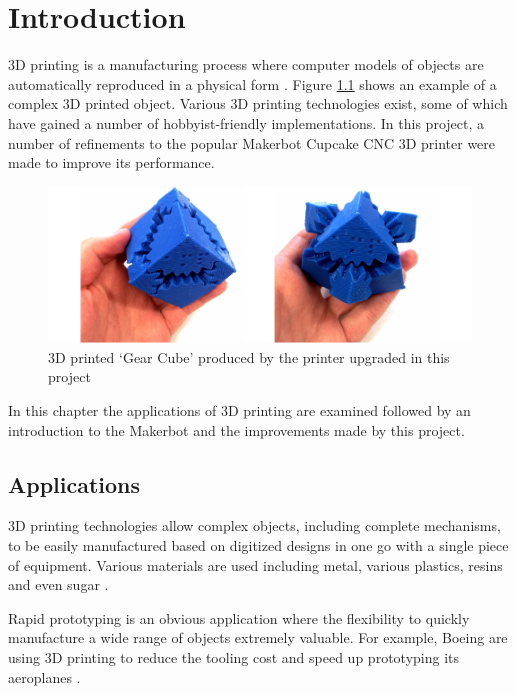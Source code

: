 \chapter{Introduction}
	
	
	3D printing is a manufacturing process where computer models of objects are
	automatically reproduced in a physical form \cite{additivemanufacturing}.
	Figure \ref{fig:gearCube} shows an example of a complex 3D printed object.
	Various 3D printing technologies exist, some of which have gained a number of
	hobbyist-friendly implementations. In this project, a number of refinements to
	the popular Makerbot Cupcake CNC 3D printer were made to improve its
	performance.
	
	\begin{figure}
		\includegraphics[width=1\textwidth]{diagrams/gearCube.pdf}
		\caption{3D printed `Gear Cube' produced by the printer upgraded in this
		project}
		\label{fig:gearCube}
	\end{figure}
	
	In this chapter the applications of 3D printing are examined followed by an
	introduction to the Makerbot and the improvements made by this project.
	
	\section{Applications}
		
		3D printing technologies allow complex objects, including complete
		mechanisms, to be easily manufactured based on digitized designs in one go
		with a single piece of equipment. Various materials are used including
		metal, various plastics, resins and even sugar \cite{candyfab}.
		
		Rapid prototyping is an obvious application where the flexibility to quickly
		manufacture a wide range of objects extremely valuable. For example, Boeing
		are using 3D printing to reduce the tooling cost and speed up prototyping
		its aeroplanes \cite{boeing3dprint}.
		

